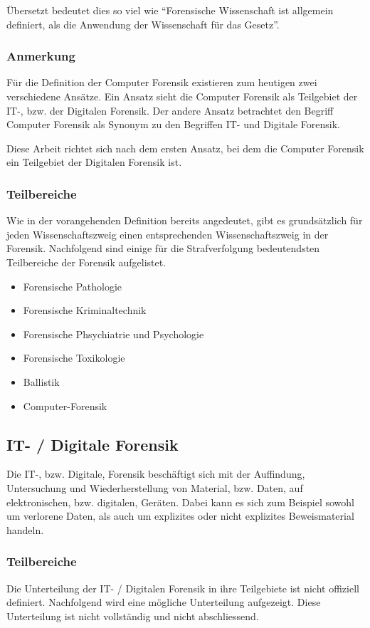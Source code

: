 Übersetzt bedeutet dies so viel wie "`Forensische Wissenschaft ist allgemein definiert, als die Anwendung der Wissenschaft für das Gesetz"'.

\subsubsection{Anmerkung}
Für die Definition der Computer Forensik existieren zum heutigen zwei verschiedene Ansätze. Ein Ansatz sieht die Computer Forensik als Teilgebiet der IT-, bzw. der Digitalen Forensik. Der andere Ansatz betrachtet den Begriff Computer Forensik als Synonym zu den Begriffen IT- und Digitale Forensik.

Diese Arbeit richtet sich nach dem ersten Ansatz, bei dem die Computer Forensik ein Teilgebiet der Digitalen Forensik ist.

\subsubsection{Teilbereiche}
Wie in der vorangehenden Definition bereits angedeutet, gibt es grundsätzlich für jeden Wissenschaftszweig einen entsprechenden Wissenschaftszweig in der Forensik. Nachfolgend sind einige für die Strafverfolgung bedeutendsten Teilbereiche der Forensik aufgelistet. \cite{E:Gabler:Forensik}

\begin{itemize}
\item Forensische Pathologie
\item Forensische Kriminaltechnik
\item Forensische Phsychiatrie und Psychologie
\item Forensische Toxikologie
\item Ballistik
\item Computer-Forensik
\end{itemize}


\subsection{IT- / Digitale Forensik}
Die IT-, bzw. Digitale, Forensik beschäftigt sich mit der Auffindung, Untersuchung und Wiederherstellung von Material, bzw. Daten, auf elektronischen, bzw. digitalen, Geräten. Dabei kann es sich zum Beispiel sowohl um verlorene Daten, als auch um explizites oder nicht explizites Beweismaterial handeln.

\subsubsection{Teilbereiche}
Die Unterteilung der IT- / Digitalen Forensik in ihre Teilgebiete ist nicht offiziell definiert. Nachfolgend wird eine mögliche Unterteilung aufgezeigt. Diese Unterteilung ist nicht vollständig und nicht abschliessend.

